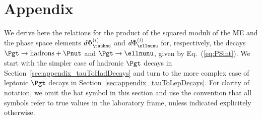 \section{Appendix}
\label{sec:appendix}

We derive here the relations for the product of the squared moduli of the ME and the phase space elements
$d\Phi^{(i)}_{\tauhnu}$ and $d\Phi^{(i)}_{\ellnunu}$ for,
respectively, the decays $\Pgt \to \textrm{hadrons} + \Pnut$ and $\Pgt \to \ellnunu$, given by Eq.~(\ref{eq:PSint}).
We start with the simpler case of hadronic $\Pgt$ decays in
Section~\ref{sec:appendix_tauToHadDecays} and turn to the more complex
case of leptonic $\Pgt$ decays in
Section~\ref{sec:appendix_tauToLepDecays}.
For clarity of notation, we omit the hat symbol in this section and
use the convention that all symbols refer to true values in the laboratory frame, unless indicated
explicitely otherwise.